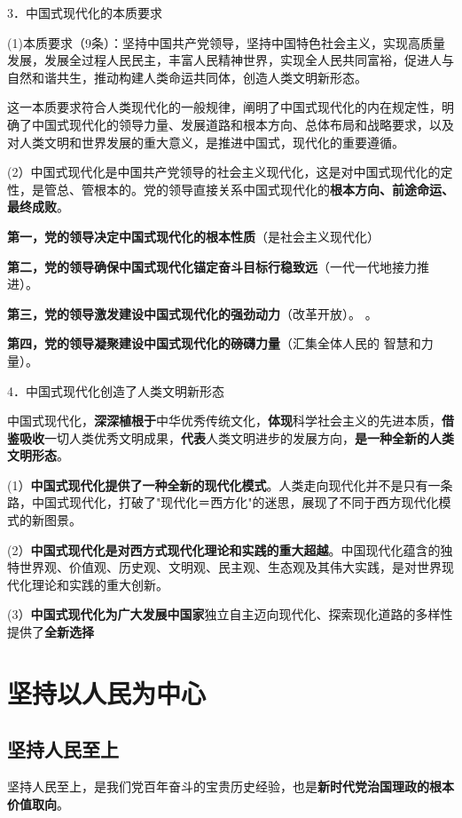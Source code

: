 \documentclass[lang=cn,10pt]{elegantbook}
\begin{document}
	3．中国式现代化的本质要求
	
	(1)本质要求（9条）：坚持中国共产党领导，坚持中国特色社会主义，实现高质量发展，发展全过程人民民主，丰富人民精神世界，实现全人民共同富裕，促进人与自然和谐共生，推动构建人类命运共同体，创造人类文明新形态。
	
	这一本质要求符合人类现代化的一般规律，阐明了中国式现代化的内在规定性，明确了中国式现代化的领导力量、发展道路和根本方向、总体布局和战略要求，以及对人类文明和世界发展的重大意义，是推进中国式，现代化的重要遵循。
	
	(2）中国式现代化是中国共产党领导的社会主义现代化，这是对中国式现代化的定性，是管总、管根本的。党的领导直接关系中国式现代化的\textbf{根本方向、前途命运、最终成败}。
	
	\textbf{第一，党的领导决定中国式现代化的根本性质}（是社会主义现代化）
	
	\textbf{第二，党的领导确保中国式现代化锚定奋斗目标行稳致远}（一代一代地接力推进）。
	
	\textbf{第三，党的领导激发建设中国式现代化的强劲动力}（改革开放）。
	。
	
	\textbf{第四，党的领导凝聚建设中国式现代化的磅礴力量}（汇集全体人民的
	智慧和力量）。
	
	4．中国式现代化创造了人类文明新形态
	
	中国式现代化，\textbf{深深植根于}中华优秀传统文化，\textbf{体现}科学社会主义的先进本质，\textbf{借鉴吸收}一切人类优秀文明成果，\textbf{代表}人类文明进步的发展方向，\textbf{是一种全新的人类文明形态}。
	
	(1）\textbf{中国式现代化提供了一种全新的现代化模式}。人类走向现代化并不是只有一条路，中国式现代化，打破了"现代化＝西方化"的迷思，展现了不同于西方现代化模式的新图景。
	
	(2）\textbf{中国式现代化是对西方式现代化理论和实践的重大超越}。中国现代化蕴含的独特世界观、价值观、历史观、文明观、民主观、生态观及其伟大实践，是对世界现代化理论和实践的重大创新。
	
	(3）\textbf{中国式现代化为广大发展中国家}独立自主迈向现代化、探索现化道路的多样性提供了\textbf{全新选择}
	\chapter{坚持以人民为中心}
	\section{坚持人民至上}
	
	坚持人民至上，是我们党百年奋斗的宝贵历史经验，也是\textbf{新时代党治国理政的根本价值取向}。
	
\end{document}
